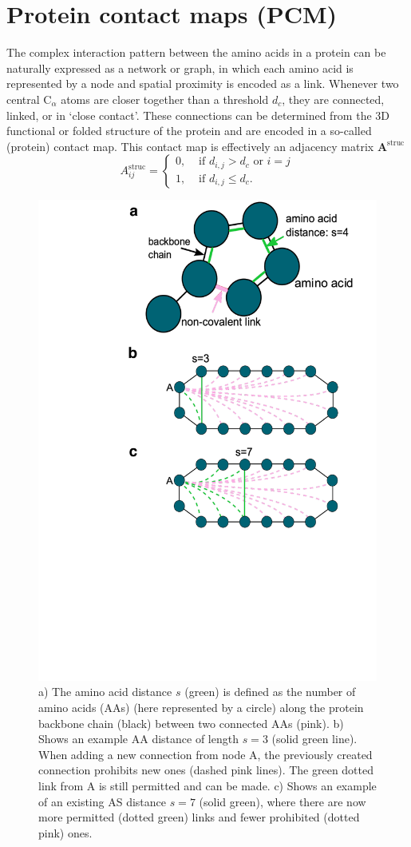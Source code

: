 \documentclass[10pt]{iopart}
\begin{document}
\section{Protein contact maps (PCM)}
\label{sec:methods}
The complex interaction pattern between the amino acids in a protein can be naturally expressed as a network or graph, in which each amino acid is represented by a node and spatial proximity is encoded as a link. Whenever two central $\mathrm{C}_\alpha$ atoms are closer together than a threshold $d_c$, they are connected, linked, or in `close contact'. These connections can be determined from the 3D functional or folded structure of the protein and are encoded in a so-called (protein) contact map. This contact map is effectively an adjacency matrix $\textbf{A}^{\mathrm{struc}}$ 
\begin{equation}
  A^{\mathrm{struc}}_{ij}=
  \begin{cases}
   0, & \text{ if } d_{i,j}>d_c \text{ or } i=j\\
      1, & \text{ if } d_{i,j}\leq d_c.
      \end{cases}
    \label{eq:aij}
\end{equation}

\begin{figure}[h!]
    \centering
    \includegraphics[width=0.5\columnwidth]{figures/Fig1/Fig1.pdf}
    \caption{a) The amino acid distance $s$ (green) is defined as the number of amino acids (AAs) (here represented by a circle) along the protein backbone chain (black) between two connected AAs (pink). b) Shows an example AA distance of length $s=3$ (solid green line). When adding a new connection from node A, the previously created connection prohibits new ones (dashed pink lines). The green dotted link from A is still permitted and can be made. c) Shows an example of an existing AS distance $s=7$ (solid green), where there are now more permitted (dotted green) links and fewer prohibited (dotted pink) ones.}
    \label{fig:schematic}
\end{figure}
\end{document}
